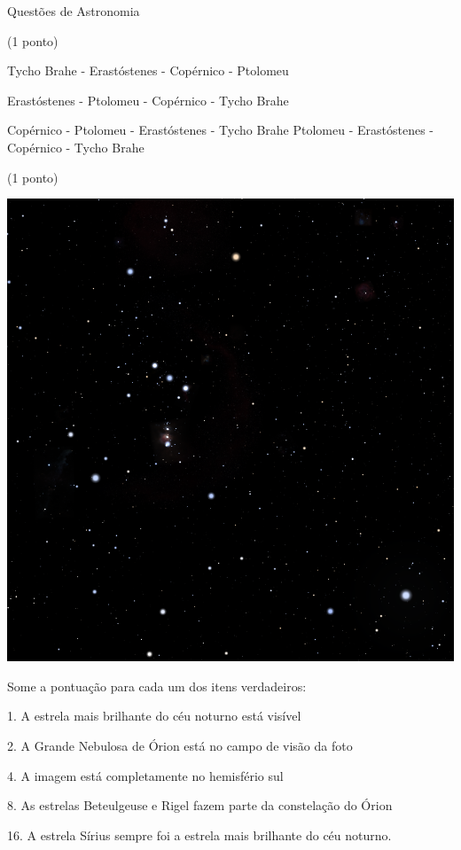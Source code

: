 \documentclass{../lista}
\begin{document}
\begin{secao}{Questões de Astronomia}
\begin{questao}{(1 ponto)}
			\begin{alternativas}
				\item Tycho Brahe - Erastóstenes - Copérnico - Ptolomeu
				\item Erastóstenes - Ptolomeu - Copérnico - Tycho Brahe
				\item Copérnico - Ptolomeu - Erastóstenes - Tycho Brahe
				\alternativaMarcada Ptolomeu - Erastóstenes - Copérnico - Tycho Brahe
			\end{alternativas}
		\end{questao}
		\begin{questao}{(1 ponto)}
			\begin{center}
				\includegraphics[height=.75\linewidth]{./img/4.png}
			\end{center}
			
			Some a pontuação para cada um dos itens verdadeiros:
			
			1. A estrela mais brilhante do céu noturno está visível
			
			2. A Grande Nebulosa de Órion está no campo de visão da foto
			
			4. A imagem está completamente no hemisfério sul
			
			8. As estrelas Beteulgeuse e Rigel fazem parte da constelação do Órion
			
			16. A estrela Sírius sempre foi a estrela mais brilhante do céu noturno.
			

\end{questao}
\end{secao}
\end{document}
